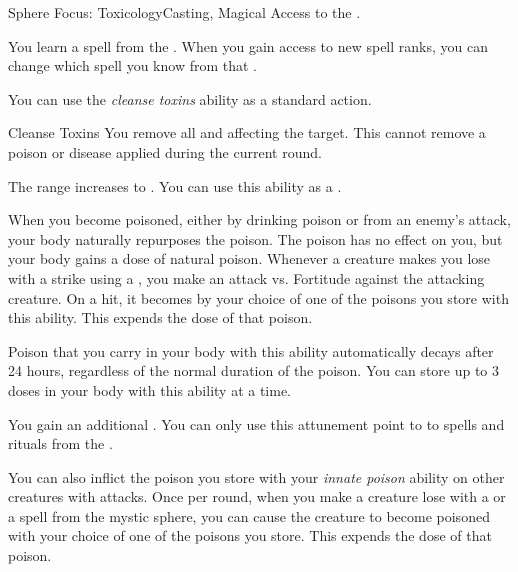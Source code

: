     \begin{feat}{Sphere Focus: Toxicology}{Casting, Magical}
        \featpre Access to the  .

         You learn a spell from the  .
        When you gain access to new spell ranks, you can change which spell you know from that .

         You can use the \textit{cleanse toxins} ability as a standard action.
        \begin{freeability}{Cleanse Toxins}
            \label{Cleanse Toxins}
            You remove all  and  affecting the target.
            This cannot remove a poison or disease applied during the current round.

            \rankline
             The range increases to \rngmed.
             You can use this ability as a .
        \end{freeability}

        When you become poisoned, either by drinking poison or from an enemy's attack, your body naturally repurposes the poison.
        The poison has no effect on you, but your body gains a dose of natural poison.
        Whenever a creature makes you lose  with a  strike using a , you make an attack vs. Fortitude against the attacking creature.
        On a hit, it becomes  by your choice of one of the poisons you store with this ability.
        This expends the dose of that poison.

        Poison that you carry in your body with this ability automatically decays after 24 hours, regardless of the normal duration of the poison.
        You can store up to 3 doses in your body with this ability at a time.

         You gain an additional .
        You can only use this attunement point to  to spells and rituals from the  .

        You can also inflict the poison you store with your \textit{innate poison} ability on other creatures with attacks.
        Once per round, when you make a creature lose  with a  or a spell from the  mystic sphere, you can cause the creature to become poisoned with your choice of one of the poisons you store.
        This expends the dose of that poison.


\end{feat}
